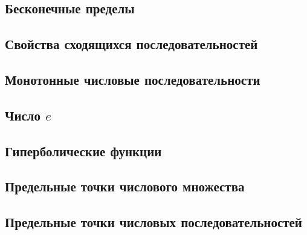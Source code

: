 \documentclass[a4paper,12pt]{article} %
\begin{document}
\subsection{Бесконечные пределы}
\subsection{Свойства сходящихся последовательностей}
\subsection{Монотонные числовые последовательности}
\subsection{Число $e$}
\subsection{Гиперболические функции}
\subsection{Предельные точки числового множества}
\subsection{Предельные точки числовых последовательностей}
\end{document}
